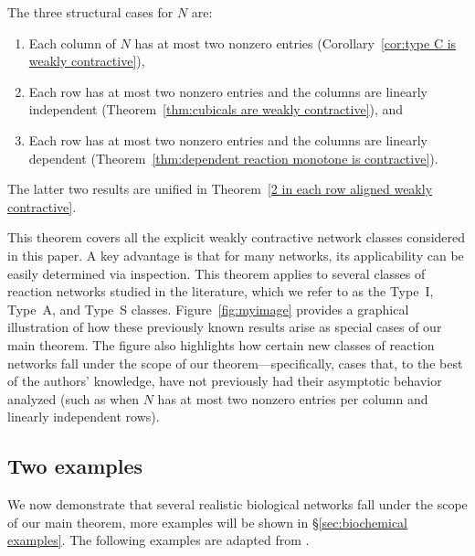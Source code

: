 \documentclass{article}
\begin{document}
The three structural cases for \(N\) are:
\begin{enumerate}
    \item Each column of \(N\) has at most two nonzero entries (Corollary~\ref{cor:type C is weakly contractive}),
    \item Each row has at most two nonzero entries and the columns are linearly independent (Theorem~\ref{thm:cubicals are weakly contractive}), and
    \item Each row has at most two nonzero entries and the columns are linearly dependent (Theorem~\ref{thm:dependent reaction monotone is contractive}).
\end{enumerate}

The latter two results are unified in Theorem~\ref{2 in each row aligned weakly contractive}.



This theorem covers all the explicit weakly contractive network classes considered in this paper. A key advantage is that for many networks, its applicability can be easily determined via inspection. This theorem applies to several classes of reaction networks studied in the literature, which we refer to as the Type~I, Type~A, and Type~S classes. Figure~\ref{fig:myimage} provides a graphical illustration of how these previously known results arise as special cases of our main theorem. The figure also highlights how certain new classes of reaction networks fall under the scope of our theorem—specifically, cases that, to the best of the authors' knowledge, have not previously had their asymptotic behavior analyzed (such as when \( N \) has at most two nonzero entries per column and linearly independent rows).




\subsection{Two examples} We now demonstrate that several realistic biological networks fall under the scope of our main theorem, more examples will be shown in \S \ref{sec:biochemical examples}. The following examples are adapted from \cite{10.1371/journal.pcbi.1007681}.
\end{document}
